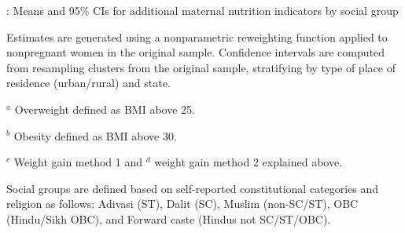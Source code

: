 \documentclass[12pt]{article}
\begin{document}
\newpage
\begin{landscape}
\begin{table}[!htbp]
\centering
\begin{adjustbox}{center, max width=0.95\linewidth} %
\begin{threeparttable}
    \small
    \caption{: Means and 95\% CIs for additional maternal nutrition indicators by social group}
    \label{tab:addnut}

    \setlength{\tabcolsep}{2pt}
    \renewcommand{\arraystretch}{1.35}

    

    \begin{tablenotes}
        \item Estimates are generated using a nonparametric reweighting function applied to nonpregnant women in the original sample. Confidence intervals are computed from resampling clusters from the original sample, stratifying by type of place of residence (urban/rural) and state.
        \item $^{a}$ Overweight defined as BMI above 25.
        \item $^{b}$ Obesity defined as BMI above 30.
        \item $^{c}$ Weight gain method 1 and $^{d}$ weight gain method 2 explained above.
        \item Social groups are defined based on self-reported constitutional categories and religion as follows: Adivasi (ST), Dalit (SC), Muslim (non‐SC/ST), OBC (Hindu/Sikh OBC), and Forward caste (Hindus not SC/ST/OBC).
    \end{tablenotes}

\end{threeparttable}
\end{adjustbox}
\end{table}
\end{landscape}
\end{document}
